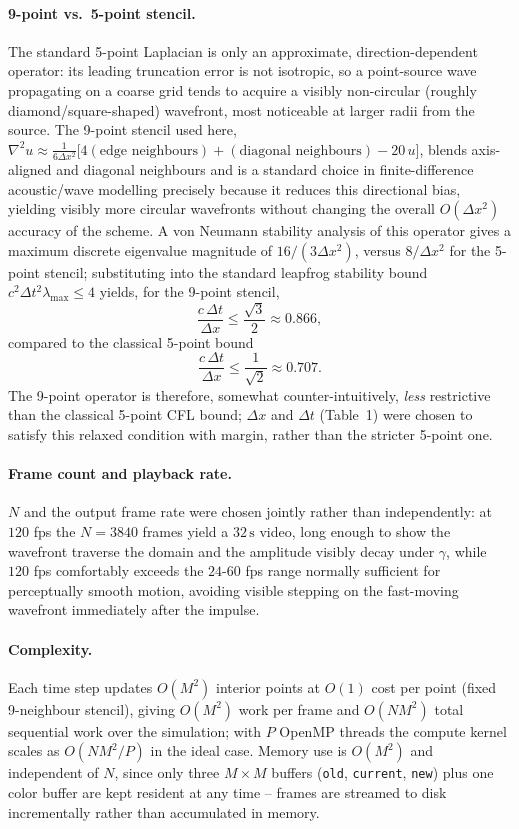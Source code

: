 \paragraph{9-point vs.\ 5-point stencil.} The standard 5-point
Laplacian is only an approximate, direction-dependent operator: its
leading truncation error is not isotropic, so a point-source wave
propagating on a coarse grid tends to acquire a visibly
non-circular (roughly diamond/square-shaped) wavefront, most
noticeable at larger radii from the source. The 9-point stencil used
here, $\nabla^2 u \approx \frac{1}{6\Delta x^2}\big[4(\text{edge
neighbours}) + (\text{diagonal neighbours}) - 20\,u\big]$, blends
axis-aligned and diagonal neighbours and is a standard choice in
finite-difference acoustic/wave modelling precisely because it
reduces this directional bias, yielding visibly more circular
wavefronts without changing the overall $O(\Delta x^2)$ accuracy of
the scheme. A von Neumann stability analysis of this operator gives
a maximum discrete eigenvalue magnitude of $16/(3\Delta x^2)$,
versus $8/\Delta x^2$ for the 5-point stencil; substituting into the
standard leapfrog stability bound
$c^2\Delta t^2\lambda_{\max}\le 4$ yields, for the 9-point stencil,
\[
  \frac{c\,\Delta t}{\Delta x} \le \frac{\sqrt{3}}{2} \approx 0.866,
\]
compared to the classical 5-point bound
\[
  \frac{c\,\Delta t}{\Delta x} \le \frac{1}{\sqrt2} \approx 0.707.
\]
The 9-point operator is therefore, somewhat counter-intuitively,
\emph{less} restrictive than the classical 5-point CFL bound; $\Delta
x$ and $\Delta t$ (Table~1) were chosen to satisfy this
relaxed condition with margin, rather than the stricter 5-point one.

\paragraph{Frame count and playback rate.} $N$ and the output frame
rate were chosen jointly rather than independently: at $120$ fps the
$N=3840$ frames yield a $32\,\mathrm{s}$ video, long enough to show
the wavefront traverse the domain and the amplitude visibly decay
under $\gamma$, while $120$ fps comfortably exceeds the
$24$-$60$ fps range normally sufficient for perceptually smooth
motion, avoiding visible stepping on the fast-moving wavefront
immediately after the impulse.

\paragraph{Complexity.} Each time step updates $O(M^2)$ interior
points at $O(1)$ cost per point (fixed 9-neighbour stencil), giving
$O(M^2)$ work per frame and $O(NM^2)$ total sequential work over the
simulation; with $P$ OpenMP threads the compute kernel scales as
$O(NM^2/P)$ in the ideal case. Memory use is $O(M^2)$ and independent
of $N$, since only three $M\times M$ buffers (\texttt{old},
\texttt{current}, \texttt{new}) plus one color buffer are kept
resident at any time -- frames are streamed to disk incrementally
rather than accumulated in memory.

